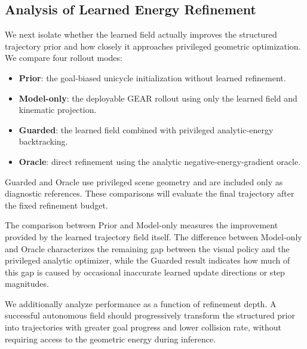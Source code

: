 \documentclass[letterpaper, 10 pt, conference]{ieeeconf}  %
\begin{document}
\subsection{Analysis of Learned Energy Refinement}
\label{sec:energy_analysis}

We next isolate whether the learned field actually improves the structured
trajectory prior and how closely it approaches privileged geometric
optimization. We compare four rollout modes:
\begin{itemize}
    \item \textbf{Prior}: the goal-biased unicycle initialization without
    learned refinement.
    \item \textbf{Model-only}: the deployable GEAR rollout using only the
    learned field and kinematic projection.
    \item \textbf{Guarded}: the learned field combined with privileged
    analytic-energy backtracking.
    \item \textbf{Oracle}: direct refinement using the analytic
    negative-energy-gradient oracle.
\end{itemize}

Guarded and Oracle use privileged scene geometry and are included only as
diagnostic references. These comparisons will evaluate the final trajectory
after the fixed refinement budget.

The comparison between Prior and Model-only measures the improvement provided
by the learned trajectory field itself. The difference between Model-only and
Oracle characterizes the remaining gap between the visual policy and the
privileged analytic optimizer, while the Guarded result indicates how much of
this gap is caused by occasional inaccurate learned update directions or step
magnitudes.

We additionally analyze performance as a function of refinement depth. A
successful autonomous field should progressively transform the structured
prior into trajectories with greater goal progress and lower collision rate,
without requiring access to the geometric energy during inference.


\balance

\end{document}
